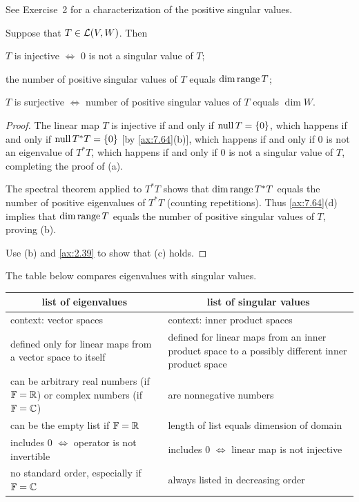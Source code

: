 See Exercise~2 for a characterization of the positive singular values.

\begin{result}\label{ax:7.68}
Suppose that $T\in\mathcal{L}(V,W)$. Then
\begin{parts}
\item $T$ is injective $\iff$ $0$ is not a singular value of $T$;
\item the number of positive singular values of $T$ equals $\operatorname{dim}\operatorname{range} T$;
\item $T$ is surjective $\iff$ number of positive singular values of $T$
  equals $\dim W$.
\end{parts}
\end{result}

\begin{proof}
The linear map $T$ is injective if and only if $\operatorname{null} T=\{0\}$, which happens if
and only if $\operatorname{null} T^*T=\{0\}$ [by \ref{ax:7.64}(b)], which happens if and only
if $0$ is not an eigenvalue of $T^*T$, which happens if and only if $0$ is not
a singular value of $T$, completing the proof of (a).

The spectral theorem applied to $T^*T$ shows that $\operatorname{dim}\operatorname{range} T^*T$ equals the
number of positive eigenvalues of $T^*T$ (counting repetitions). Thus
\ref{ax:7.64}(d) implies that $\operatorname{dim}\operatorname{range} T$ equals the number of positive
singular values of $T$, proving (b).

Use (b) and \ref{ax:2.39} to show that (c) holds.
\end{proof}

The table below compares eigenvalues with singular values.

\begin{center}\small
\begin{tabular}{|p{.44\linewidth}|p{.44\linewidth}|}
\hline
\multicolumn{1}{|c|}{\textbf{list of eigenvalues}} &
\multicolumn{1}{c|}{\textbf{list of singular values}}\\
\hline
context: vector spaces & context: inner product spaces\\
\hline
defined only for linear maps from a vector space to itself &
defined for linear maps from an inner product space to a possibly different
inner product space\\
\hline
can be arbitrary real numbers (if $\mathbb{F}=\mathbb{R}$) or complex numbers (if $\mathbb{F}=\mathbb{C}$) &
are nonnegative numbers\\
\hline
can be the empty list if $\mathbb{F}=\mathbb{R}$ & length of list equals dimension of domain\\
\hline
includes $0$ $\iff$ operator is not invertible &
includes $0$ $\iff$ linear map is not injective\\
\hline
no standard order, especially if $\mathbb{F}=\mathbb{C}$ & always listed in decreasing order\\
\hline
\end{tabular}
\end{center}

